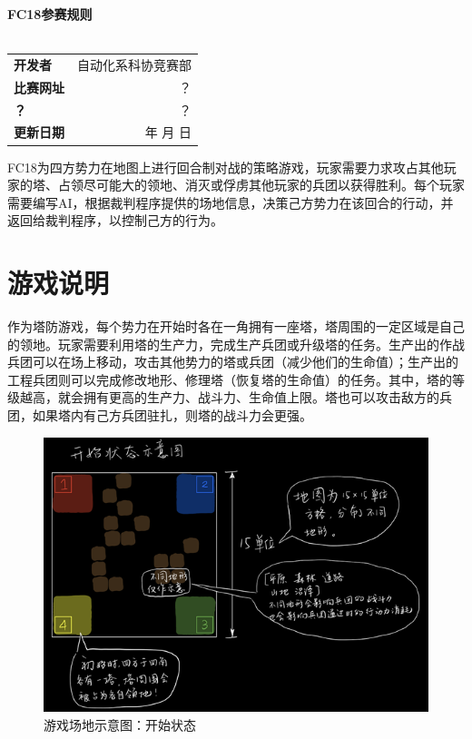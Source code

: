 \documentclass[a4paper,4pt]{article}
\renewcommand{\today}{\number\year 年 \number\month 月 \number\day 日}
\begin{document}
\begin{titlepage}
	\heiti
	\vspace*{64pt}
	\begin{center}
		\fontsize{43pt}{0} \textbf{FC18参赛规则}\\
		\vspace*{36pt}
		\\
		\vspace*{280pt}
		\Large
		\rmfamily
		\begin{tabular}{lr} %
			\textbf{开发者}   & 自动化系科协竞赛部 \\
			\textbf{比赛网址} & ？                 \\
			\textbf{？}       & ？                 \\
			\textbf{更新日期} & \today             \\
		\end{tabular}
	\end{center}
\end{titlepage}


\tableofcontents%
\newpage%

FC18为四方势力在地图上进行回合制对战的策略游戏，玩家需要力求攻占其他玩家的塔、占领尽可能大的领地、消灭或俘虏其他玩家的兵团以获得胜利。每个玩家需要编写AI，根据裁判程序提供的场地信息，决策己方势力在该回合的行动，并返回给裁判程序，以控制己方的行为。
\section{游戏说明}
作为塔防游戏，每个势力在开始时各在一角拥有一座塔，塔周围的一定区域是自己的领地。玩家需要利用塔的生产力，完成生产兵团或升级塔的任务。生产出的作战兵团可以在场上移动，攻击其他势力的塔或兵团（减少他们的生命值）；生产出的工程兵团则可以完成修改地形、修理塔（恢复塔的生命值）的任务。其中，塔的等级越高，就会拥有更高的生产力、战斗力、生命值上限。塔也可以攻击敌方的兵团，如果塔内有己方兵团驻扎，则塔的战斗力会更强。

\begin{figure}[htbp]   %
	\centering
	\includegraphics[width=5.5 in]{01开始.jpg}
	\caption{游戏场地示意图：开始状态}
	\label{jpg:示例图片1}
\end{figure}
\end{document}
